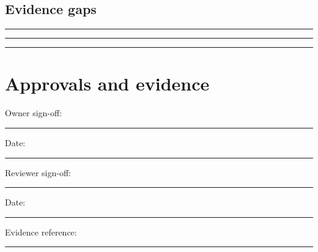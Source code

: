 \documentclass[11pt]{article}
\begin{document}
\subsection{Evidence gaps}
\noindent\rule{\linewidth}{0.3pt}\par\vspace{0.18in}
\noindent\rule{\linewidth}{0.3pt}\par\vspace{0.18in}
\noindent\rule{\linewidth}{0.3pt}\par\vspace{0.14in}

\section{Approvals and evidence}
\noindent Owner sign-off: \rule{0.42\linewidth}{0.4pt}\hfill Date: \rule{0.19\linewidth}{0.4pt}\par\vspace{0.4cm}
\noindent Reviewer sign-off: \rule{0.40\linewidth}{0.4pt}\hfill Date: \rule{0.19\linewidth}{0.4pt}\par\vspace{0.4cm}
\noindent Evidence reference: \rule{0.70\linewidth}{0.4pt}
\end{document}
